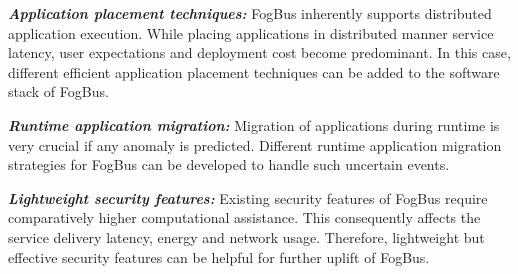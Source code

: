 \documentclass[final,5p,times,twocolumn]{elsarticle}
\begin{document}
\par \textbf{\textit{Application placement techniques:}} FogBus inherently supports distributed application execution. While placing applications in distributed manner service latency, user expectations and deployment cost become predominant. In this case, different efficient application placement techniques can be added to the software stack of FogBus. 
\par \textbf{\textit{Runtime application migration:}} Migration of applications during runtime is very crucial if any anomaly is predicted. Different runtime application migration strategies for FogBus can be developed to handle such uncertain events.         
\par \textbf{\textit{Lightweight security features:}} Existing security features of FogBus require comparatively higher computational assistance. This consequently affects the service delivery latency, energy and network usage. Therefore, lightweight but effective security features can be helpful for further uplift of FogBus.    
 



\end{document}
